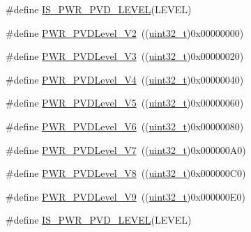 \begin{DoxyCompactItemize}
\item 
\#define \hyperlink{group___p_v_d__detection__level_gabac4485a57abc97aad91eaa0b65ae927}{I\+S\+\_\+\+P\+W\+R\+\_\+\+P\+V\+D\+\_\+\+L\+E\+V\+EL}(L\+E\+V\+EL)
\item 
\#define \hyperlink{group___p_v_d__detection__level_ga5cf8b09ed099c7412fcee6ccec2ec20b}{P\+W\+R\+\_\+\+P\+V\+D\+Level\+\_\+V2}~((\hyperlink{_p_e___types_8h_a33594304e786b158f3fb30289278f5af}{uint32\+\_\+t})0x00000000)
\item 
\#define \hyperlink{group___p_v_d__detection__level_ga561e543dedb4c2cb126ec8d9d604260c}{P\+W\+R\+\_\+\+P\+V\+D\+Level\+\_\+V3}~((\hyperlink{_p_e___types_8h_a33594304e786b158f3fb30289278f5af}{uint32\+\_\+t})0x00000020)
\item 
\#define \hyperlink{group___p_v_d__detection__level_ga5b585e7e6eda29e8b119e16779ba7a8b}{P\+W\+R\+\_\+\+P\+V\+D\+Level\+\_\+V4}~((\hyperlink{_p_e___types_8h_a33594304e786b158f3fb30289278f5af}{uint32\+\_\+t})0x00000040)
\item 
\#define \hyperlink{group___p_v_d__detection__level_gad91e74c3034a5baccca70250815e680e}{P\+W\+R\+\_\+\+P\+V\+D\+Level\+\_\+V5}~((\hyperlink{_p_e___types_8h_a33594304e786b158f3fb30289278f5af}{uint32\+\_\+t})0x00000060)
\item 
\#define \hyperlink{group___p_v_d__detection__level_ga46174e5288082b59473068a3ca8e8ea6}{P\+W\+R\+\_\+\+P\+V\+D\+Level\+\_\+V6}~((\hyperlink{_p_e___types_8h_a33594304e786b158f3fb30289278f5af}{uint32\+\_\+t})0x00000080)
\item 
\#define \hyperlink{group___p_v_d__detection__level_ga72d22a858d8289ef02fff45f4810b916}{P\+W\+R\+\_\+\+P\+V\+D\+Level\+\_\+V7}~((\hyperlink{_p_e___types_8h_a33594304e786b158f3fb30289278f5af}{uint32\+\_\+t})0x000000\+A0)
\item 
\#define \hyperlink{group___p_v_d__detection__level_ga5f38835a95c026b1db16dbebf81b45a2}{P\+W\+R\+\_\+\+P\+V\+D\+Level\+\_\+V8}~((\hyperlink{_p_e___types_8h_a33594304e786b158f3fb30289278f5af}{uint32\+\_\+t})0x000000\+C0)
\item 
\#define \hyperlink{group___p_v_d__detection__level_ga9c156a7155f9946c0d3a73794f51a1ce}{P\+W\+R\+\_\+\+P\+V\+D\+Level\+\_\+V9}~((\hyperlink{_p_e___types_8h_a33594304e786b158f3fb30289278f5af}{uint32\+\_\+t})0x000000\+E0)
\item 
\#define \hyperlink{group___p_v_d__detection__level_gabac4485a57abc97aad91eaa0b65ae927}{I\+S\+\_\+\+P\+W\+R\+\_\+\+P\+V\+D\+\_\+\+L\+E\+V\+EL}(L\+E\+V\+EL)
\end{DoxyCompactItemize}


